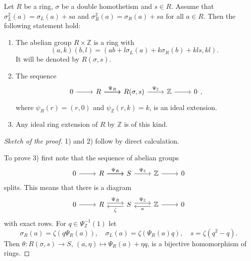 \documentclass{svmult}
\newcommand{\Z}{\mathbb{Z}}
\begin{document}
\begin{theorem}
    Let $R$ be a ring, $\sigma$ be a double homothetism and $s\in R$. 
    Assume that $\sigma_L^2(a)=\sigma_L(a)+sa$ and 
    $\sigma_R^2(a)=\sigma_R(a)+sa$ for all $a\in R$. 
    Then the following statement hold:
    \begin{enumerate}
        \item The abelian group $R\times\Z$ is a ring with
        \[
        (a,k)(b,l)=(ab+l\sigma_L(a)+k\sigma_R(b)+kls,kl).
        \]
        It will be denoted by $R(\sigma,s)$. 
        \item The sequence 
        \[
        \begin{tikzcd}
	    {0} & {R} & {R(\sigma,s)} & {\Z} & {0}
	    \arrow["{\Psi_R}", from=1-2, to=1-3]
	    \arrow[from=1-1, to=1-2]
	    \arrow[from=1-2, to=1-3]
	    \arrow["{\Psi_{\Z}}", from=1-3, to=1-4]
	    \arrow[from=1-4, to=1-5]
    \end{tikzcd},
    \]
    where $\psi_R(r)=(r,0)$ and $\psi_{\Z}(r,k)=k$, is an ideal extension. 
    \item Any ideal ring extension of $R$ by $\Z$ is of this kind. 
    \end{enumerate}
\end{theorem}

\begin{proof}[Sketch of the proof]
    1) and 2) follow by direct calculation. 
    
    To prove 3) first note that
    the sequence of abelian groups 
    \[
    \begin{tikzcd}
	    {0} & {R} & {S} & {\Z} & {0}
	    \arrow["{\Psi_R}", from=1-2, to=1-3]
	    \arrow[from=1-1, to=1-2]
	    \arrow[from=1-2, to=1-3]
	    \arrow["{\Psi_{\Z}}", from=1-3, to=1-4]
	    \arrow[from=1-4, to=1-5]
    \end{tikzcd}
    \]
    splits. This means that there is a diagram 
\[\begin{tikzcd}
	0 & R & S & {\mathbb{Z}} & 0
	\arrow[from=1-1, to=1-2]
	\arrow[from=1-4, to=1-5]
	\arrow["{\Psi_{\mathbb{Z}}}", shift left=1, from=1-3, to=1-4]
	\arrow["{\Psi_R}", shift left=1, from=1-2, to=1-3]
	\arrow["{\kappa }", shift left=1, from=1-4, to=1-3]
	\arrow["{\zeta }", shift left=1, from=1-3, to=1-2]
\end{tikzcd}\]
    with exact rows. For $q\in\Psi_{\Z}^{-1}(1)$ let 
    \[
    \sigma_R(a)=\zeta(q\Psi_R(a)),
    \quad
    \sigma_L(a)=\zeta(\Psi_R(a)q),
    \quad
    s=\zeta(q^2-q).
    \]
    Then $\theta\colon R(\sigma,s)\to S$, $(a,\eta)\mapsto \Psi_R(a)+\eta q$, 
    is a bijective homomorphism of rings. 
\end{proof}
\end{document}
